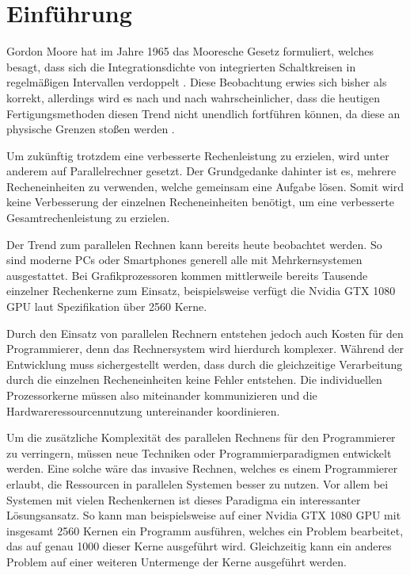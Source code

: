 \chapter{Einführung}\label{sec:intro}

Gordon Moore hat im Jahre 1965 das Mooresche Gesetz formuliert, welches besagt, dass sich die Integrationsdichte
von integrierten Schaltkreisen in regelmäßigen Intervallen verdoppelt \cite{mooresLawPastPresentFuture}.
Diese Beobachtung erwies sich bisher als korrekt, allerdings wird es nach und nach wahrscheinlicher,
dass die heutigen Fertigungsmethoden diesen Trend nicht unendlich fortführen können, da diese an
physische Grenzen stoßen werden \cite{endOfMooresLaw}.

Um zukünftig trotzdem eine verbesserte Rechenleistung zu erzielen, wird unter anderem auf Parallelrechner gesetzt.
Der Grundgedanke dahinter ist es, mehrere Recheneinheiten zu verwenden, welche gemeinsam eine Aufgabe
lösen. Somit wird keine Verbesserung der einzelnen Recheneinheiten benötigt, um eine verbesserte Gesamtrechenleistung
zu erzielen.

Der Trend zum parallelen Rechnen kann bereits heute beobachtet werden.
So sind moderne PCs oder Smartphones generell alle mit Mehrkernsystemen ausgestattet.
Bei Grafikprozessoren kommen mittlerweile bereits Tausende einzelner Rechenkerne zum Einsatz,
beispielsweise verfügt die Nvidia GTX 1080 GPU laut Spezifikation \cite{nvidia1080specs} über 2560 Kerne.

Durch den Einsatz von parallelen Rechnern entstehen jedoch auch Kosten für den Programmierer,
denn das Rechnersystem wird hierdurch komplexer.
Während der Entwicklung muss sichergestellt werden, dass durch die gleichzeitige Verarbeitung durch die einzelnen
Recheneinheiten keine Fehler entstehen. Die individuellen Prozessorkerne müssen also miteinander
kommunizieren und die Hardwareressourcennutzung untereinander koordinieren.

Um die zusätzliche Komplexität des parallelen Rechnens für den Programmierer zu verringern,
müssen neue Techniken oder Programmierparadigmen entwickelt werden.
Eine solche wäre das invasive Rechnen, welches es einem Programmierer erlaubt,
die Ressourcen in parallelen Systemen besser zu nutzen.
Vor allem bei Systemen mit vielen Rechenkernen ist dieses Paradigma ein interessanter Lösungsansatz.
So kann man beispielsweise auf einer Nvidia GTX 1080 GPU mit insgesamt 2560 Kernen ein Programm
ausführen, welches ein Problem bearbeitet, das auf genau 1000 dieser Kerne ausgeführt wird.
Gleichzeitig kann ein anderes Problem auf einer weiteren Untermenge der Kerne ausgeführt werden.

